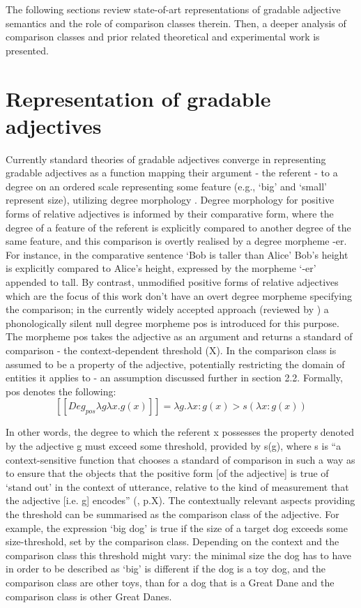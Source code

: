 The following sections review state-of-art representations of gradable adjective semantics and the role of comparison classes therein. Then, a deeper analysis of comparison classes and prior related theoretical and experimental work is presented. 

\section{Representation of gradable adjectives}
Currently standard theories of gradable adjectives converge in representing gradable adjectives as a function mapping their argument - the referent - to a degree on an ordered scale representing some feature (e.g., ‘big’ and ‘small’ represent size),  utilizing degree morphology \parencite{Kennedy2007}. Degree morphology for positive forms of relative adjectives is informed by their comparative form, where the degree of a feature of the referent is explicitly compared to another degree of the same feature, and this comparison is overtly realised by a degree morpheme -er. For instance, in the comparative sentence ‘Bob is taller than Alice’ Bob’s height is explicitly compared to Alice’s height, expressed by the morpheme ‘-er’ appended to tall. 
By contrast, unmodified positive forms of relative adjectives which are the focus of this work don’t have an overt degree morpheme specifying the comparison; in the currently widely accepted approach (reviewed by \cite{Kennedy2007}) a phonologically silent null degree morpheme pos is introduced for this purpose. 
The morpheme pos takes the adjective as an argument and returns a standard of comparison - the context-dependent threshold (X). In \cite{Kennedy2007} the comparison class is assumed to be a property of the adjective, potentially restricting the domain of entities it applies to - an assumption discussed further in section 2.2. Formally, pos denotes the following:
$$[[Deg_{pos} \lambda g \lambda x. g(x)  ]] = \lambda g. \lambda x: g(x) > s(\lambda x: g(x))$$

In other words, the degree to which the referent x possesses the property denoted by the adjective g must exceed some threshold, provided by s(g), where s is “a context-sensitive function that chooses a standard of comparison in such a way as to ensure that the objects that the positive form [of the adjective] is true of ‘stand out’ in the context of utterance, relative to the kind of measurement that the adjective [i.e. g] encodes” (\cite{Kennedy2007}, p.X). The contextually relevant aspects providing the threshold can be summarised as the comparison class of the adjective. 
For example, the expression ‘big dog’ is true if the size of a target dog exceeds some size-threshold, set by the comparison class. Depending on the context and the comparison class this threshold might vary: the minimal size the dog has to have in order to be described as ‘big’ is different if the dog is a toy dog, and the comparison class are other toys, than for a dog that is a Great Dane and the comparison class is other Great Danes.

